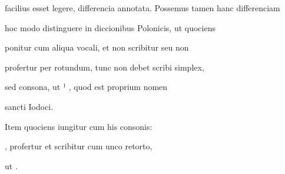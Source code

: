 facilius esset legere, differencia annotata. Possemus tamen hanc differenciam

hoc modo distinguere in diccionibus Polonicis, ut quociens 

ponitur cum aliqua vocali, et non scribitur seu non

profertur per  rotundum, tunc non debet scribi  simplex,

sed  consona, ut ¹  , quod est proprium nomen

\splitlines

sancti Iodoci.

\indentK Item quociens iungitur cum his consonis: 

\fulllines

    , profertur et scribitur cum unco retorto,


\fullpreviouslines

{
\color{blue}

ut    .

}






\endinput








«s -yy rfep.; v.





\catcode `\^^M=5

  \newtip{48}{Łoś niesłusznie uważa, że \textit{bika} w obu wypadkach
    napisano błędnie zamiast \textit{ƀyka}. Przykłady są bowiem podane
    w~pisowni dotychczasowej dla pokazania jej niewystarczalności do
    zróżnicowania wyrazów \textit{bika} i \textit{byka}.}

\obeylines






\newcommand{\margin}[1]{\annotatetextBlue{\{#1\}}{zapisy na marginesie}}


